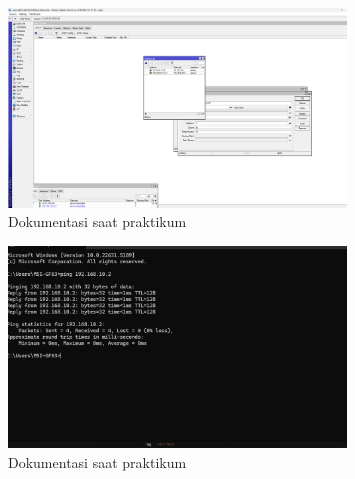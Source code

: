 \begin{figure}
    \centering
    \includegraphics[width=0.8\textwidth]{P1/img/routing2.png}
    \caption{Dokumentasi saat praktikum}
    \label{fig:dokumentasi_praktikum_7}
\end{figure}
\begin{figure}
    \centering
    \includegraphics[width=0.8\textwidth]{P1/img/routing3.png}
    \caption{Dokumentasi saat praktikum}
    \label{fig:dokumentasi_praktikum_8}
\end{figure}